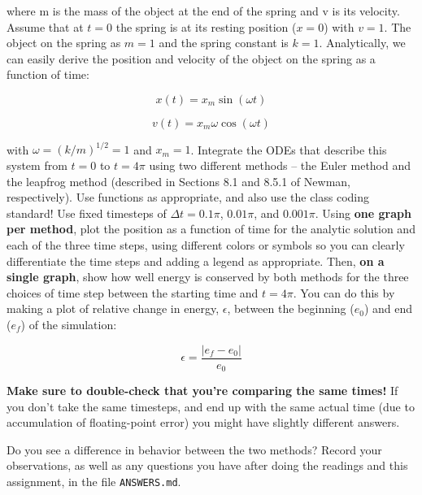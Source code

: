 \documentclass[10pt]{article}
\begin{document}
where m is the mass of the object at the end of the spring and v is
its velocity.  Assume that at $t=0$ the spring is at its resting
position ($x=0$) with $v=1$.  The object on the spring as $m=1$ and
the spring constant is $k=1$.  Analytically, we can easily derive
the position and velocity of the object on the spring as a function of
time:

\begin{equation}
x(t) = x_m \sin(\omega t)
\end{equation}

\begin{equation}
v(t) = x_m \omega \cos(\omega t)
\end{equation}

with $\omega = (k/m)^{1/2} = 1$ and $x_m = 1$.
Integrate the ODEs that describe this system from $t=0$ to $t=4\pi$
using two different methods -- the Euler method and the
leapfrog method (described in Sections 8.1 and 8.5.1 of Newman,
respectively).  Use functions as appropriate, and also use the class
coding standard!
Use fixed timesteps of $\Delta t = 0.1 \pi$, $0.01 \pi$, and
$0.001 \pi$.  Using \textbf{one graph per method}, plot the position as a
function of time for the analytic solution and each of the three time
steps, using different colors or symbols so you can clearly
differentiate the time steps and adding a legend as appropriate.  Then, \textbf{on a single graph}, show
how well energy is conserved by both methods for the three choices of
time step between the starting time and $t = 4 \pi$.  You can do this
by making a plot of relative change in energy, $\epsilon$, between the beginning ($e_0$)
and end ($e_f$) of the simulation: 

\begin{equation}
\epsilon =
\frac{|e_f - e_0|}{e_0}
\end{equation}

\textbf{Make sure to double-check that you're comparing the same times!}  If you
don't take the same timesteps, and end up with the same actual time
(due to accumulation of floating-point error) you might have slightly
different answers.

Do you see a difference in behavior between the two methods?  Record
your observations, as well as any questions you have after doing the
readings and this assignment, in the file \texttt{ANSWERS.md}.
\end{document}
